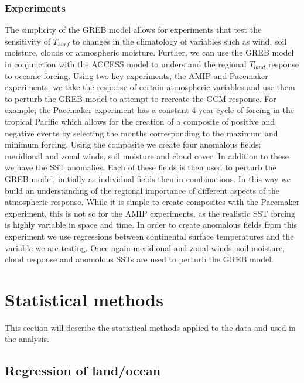 \subsubsection{Experiments}
The simplicity of the GREB model allows for experiments that test the 
sensitivity of $T_{surf}$ to changes in the climatology of variables such as 
wind, soil moisture, clouds or atmospheric moisture. Further, we can use the 
GREB model in conjunction with the ACCESS model to understand the regional 
$T_{land}$ response to oceanic forcing. Using two key experiments, the AMIP and 
Pacemaker experiments, we take the response of certain atmospheric variables and 
use them to perturb the GREB model to attempt to recreate the GCM response. For 
example; the Pacemaker experiment has a constant 4 year cycle of forcing in the 
tropical Pacific which allows for the creation of a composite of positive and 
negative events by selecting the months corresponding to the maximum and minimum 
forcing.  Using the composite we create four anomalous fields; meridional and 
zonal winds, soil moisture and cloud cover. In addition to these we have the SST 
anomalies.  Each of these fields is then used to perturb the GREB model, 
initially as individual fields then in combinations. In this way we build an 
understanding of the regional importance of different aspects of the atmospheric 
response. While it is simple to create composites with the Pacemaker experiment, 
this is not so for the AMIP experiments, as the realistic SST forcing is highly 
variable in space and time.  In order to create anomalous fields from this 
experiment we use regressions between continental surface temperatures and the 
variable we are testing. Once again meridional and zonal winds, soil moisture, 
cloud response and anomolous SSTs are used to perturb the GREB model.



\section{Statistical methods}

This section will describe the statistical methods applied to the data and used 
in the analysis.


\subsection{Regression of land/ocean}\label{ssec:rlo}


